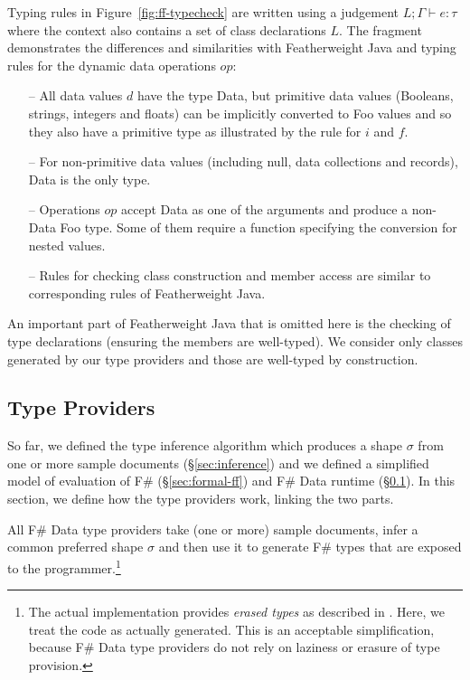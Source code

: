 \documentclass[pldi-cameraready]{sigplanconf-pldi16}
\newcommand{\kvd}[1]{\textnormal{\textcolor{kvdclr}{\sffamily #1}}}
\newcommand{\ident}[1]{\textnormal{\sffamily #1}}
\begin{document}
Typing rules in Figure~\ref{fig:ff-typecheck} are written using a judgement
$L; \Gamma \vdash e : \tau$ where the context also contains a set of class declarations $L$.
The fragment demonstrates the differences and similarities with Featherweight Java \cite{fwjava} and
typing rules for the dynamic data operations $op$:
%
\begin{itemize}
\item[--] All data values $d$ have the type \ident{Data}, but primitive data values (Booleans,
  strings, integers and floats) can be implicitly converted to Foo values and so they also have a
  primitive type as illustrated by the rule for $i$ and $f$.

\item[--] For non-primitive data values (including \kvd{null}, data collections and records),
  \ident{Data} is the only type.

\item[--] Operations $op$ accept \ident{Data} as one of the arguments and produce a non-\ident{Data}
  Foo type. Some of them require a function specifying the conversion for nested values.

\item[--] Rules for checking class construction and member access are similar to corresponding
  rules of Featherweight Java.
\end{itemize}
%
An important part of Featherweight Java that is omitted here is the checking of type declarations
(ensuring the members are well-typed). We consider only classes generated by our type providers
and those are well-typed by construction.


\subsection{Type Providers}
\label{sec:formal-tp}

So far, we defined the type inference algorithm which produces a shape $\sigma$ from one
or more sample documents (\S\ref{sec:inference}) and we defined a simplified model of evaluation
of F\# (\S\ref{sec:formal-ff}) and F\# Data runtime (\S\ref{sec:formal-tp}). In this section, we
define how the type providers work, linking the two parts.

All F\# Data type providers take (one or more) sample documents, infer a common preferred shape $\sigma$
and then use it to generate F\# types that are exposed to the programmer.\footnote{The actual
implementation provides \emph{erased types} as described in \cite{fsharp-typeprov}. Here, we treat
the code as actually generated. This is an acceptable simplification, because F\# Data type providers
do not rely on laziness or erasure of type provision.}
\end{document}

